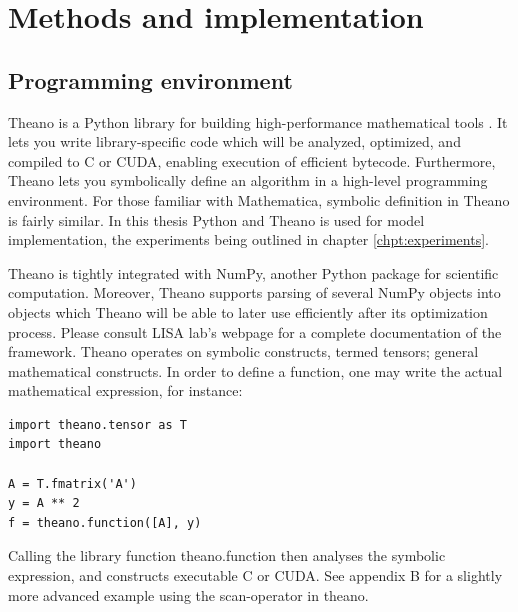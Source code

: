 
\chapter{Methods and implementation}\label{chpt:methods}

\section{Programming environment}

Theano is a Python library for building high-performance mathematical tools \citep{Bergstra2010}. It lets you write library-specific code which will be analyzed, optimized, and compiled to C or CUDA, enabling execution of efficient bytecode. Furthermore, Theano lets you symbolically define an algorithm in a high-level programming environment. For those familiar with Mathematica, symbolic definition in Theano is fairly similar. In this thesis Python and Theano is used for model implementation, the experiments being outlined in chapter \ref{chpt:experiments}.

Theano is tightly integrated with NumPy, another Python package for scientific computation. Moreover, Theano supports parsing of several NumPy objects into objects which Theano will be able to later use efficiently after its optimization process. Please consult LISA lab's webpage \citep{LISA-lab2015a} for a complete documentation of the framework.
Theano operates on symbolic constructs, termed tensors; general mathematical constructs. In order to define a function, one may write the actual mathematical expression, for instance:

\begin{verbatim}
import theano.tensor as T
import theano

A = T.fmatrix('A')
y = A ** 2
f = theano.function([A], y)
\end{verbatim}

Calling the library function theano.function then analyses the symbolic expression, and constructs executable C or CUDA. See appendix B for a slightly more advanced example using the scan-operator in theano.

